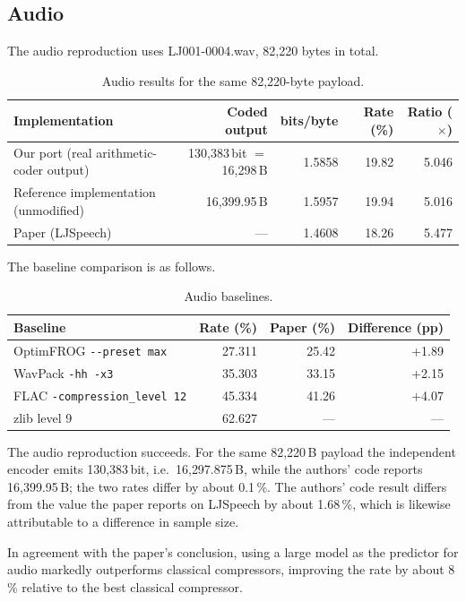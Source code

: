 \documentclass[12pt,a4paper]{article}
\begin{document}
\subsection{Audio}

The audio reproduction uses LJ001-0004.wav, 82{,}220 bytes in total.

\begin{table}[htbp]\centering\small
\caption{Audio results for the same 82{,}220-byte payload.}
\begin{tabular}{@{}lrrrr@{}}
\toprule
Implementation & Coded output & bits/byte & Rate (\%) & Ratio ($\times$) \\
\midrule
Our port (real arithmetic-coder output) & 130{,}383\,bit $=$ 16{,}298\,B & 1.5858 & 19.82 & 5.046 \\
Reference implementation (unmodified) & 16{,}399.95\,B & 1.5957 & 19.94 & 5.016 \\
Paper (LJSpeech) & --- & 1.4608 & 18.26 & 5.477 \\
\bottomrule
\end{tabular}
\end{table}

The baseline comparison is as follows.

\begin{table}[htbp]\centering\small
\caption{Audio baselines.}
\begin{tabular}{@{}lrrr@{}}
\toprule
Baseline & Rate (\%) & Paper (\%) & Difference (pp) \\
\midrule
OptimFROG \texttt{-{}-preset max} & 27.311 & 25.42 & +1.89 \\
WavPack \texttt{-hh -x3} & 35.303 & 33.15 & +2.15 \\
FLAC \texttt{-compression\_level 12} & 45.334 & 41.26 & +4.07 \\
zlib level 9 & 62.627 & --- & --- \\
\bottomrule
\end{tabular}
\end{table}

The audio reproduction succeeds. For the same 82{,}220\,B payload the independent encoder
emits 130{,}383\,bit, i.e.\ 16{,}297.875\,B, while the authors' code reports 16{,}399.95\,B;
the two rates differ by about 0.1\,\%. The authors' code result differs from the value the
paper reports on LJSpeech by about 1.68\,\%, which is likewise attributable to a difference in
sample size.

In agreement with the paper's conclusion, using a large model as the predictor for audio
markedly outperforms classical compressors, improving the rate by about 8\,\% relative to the
best classical compressor.
\end{document}
